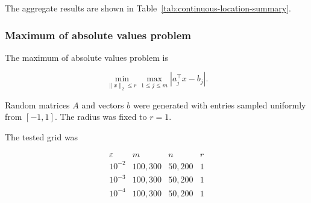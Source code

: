 \documentclass[11pt]{article}
\begin{document}
\begin{table}[H]
    \centering
    
    \caption{Continuous location results for $\varepsilon=0.01$.
    Each cell shows iterations / percentage of predicted iterations.}
    \label{tab:continuous-location-eps-001}
\end{table}

\begin{table}[H]
    \centering
    
    \caption{Continuous location results for $\varepsilon=0.001$.
    Each cell shows iterations / percentage of predicted iterations.}
    \label{tab:continuous-location-eps-0001}
\end{table}

\begin{table}[H]
    \centering
    
    \caption{Continuous location results for $\varepsilon=0.0001$.
    Each cell shows iterations / percentage of predicted iterations.}
    \label{tab:continuous-location-eps-00001}
\end{table}

The aggregate results are shown in Table~\ref{tab:continuous-location-summary}.

\begin{table}[H]
    \centering
    
    \caption{Summary of continuous location experiments.}
    \label{tab:continuous-location-summary}
\end{table}


\subsubsection{Maximum of absolute values problem}

The maximum of absolute values problem is

\[
    \min_{\|x\|_2\le r}
    \max_{1\le j\le m}|a_j^\top x-b_j|.
\]

Random matrices \(A\) and vectors \(b\) were generated with entries sampled
uniformly from \([-1,1]\). The radius was fixed to \(r=1\).

The tested grid was

\[
\begin{array}{c|c|c|c}
\varepsilon & m & n & r\\
\hline
10^{-2} & 100,300 & 50,200 & 1\\
10^{-3} & 100,300 & 50,200 & 1\\
10^{-4} & 100,300 & 50,200 & 1
\end{array}
\]
\end{document}
